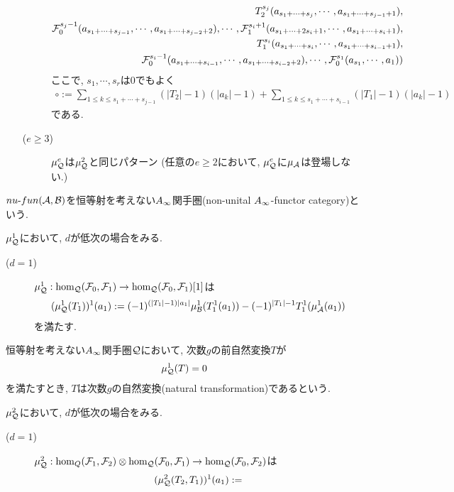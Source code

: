 \documentclass[uplatex, a4paper, 14Q, dvipdfmx]{jsarticle}
\begin{document}
\begin{definition}
\begin{itemize}
\begin{description}
\begin{align*}
        T^{s_j}_2(a_{s_1+\cdots+s_j}, \cdots, a_{s_1+\cdots+s_{j-1}+1}), \\
        \mathcal{F}^{s_j-1}_0(a_{s_1+\cdots+s_{j-1}}, \cdots, a_{s_1+\cdots+s_{j-2}+2}), \cdots, \mathcal{F}^{s_i+1}_1(a_{s_1+\cdots+2s_i+1}, \cdots, a_{s_1+\cdots+s_i+1}), \\
        T^{s_i}_1(a_{s_1+\cdots+s_i}, \cdots, a_{s_1+\cdots+s_{i-1}+1}), \\
        \mathcal{F}^{s_i-1}_0(a_{s_1+\cdots+s_{i-1}}, \cdots, a_{s_1+\cdots+s_{i-2}+2}), \cdots, \mathcal{F}^{s_1}_0(a_{s_1},\cdots,a_1)
        )
      \end{align*}
      ここで, $s_1,\cdots,s_r$は$0$でもよく 
      \begin{align*}
        \circ 
        :=\sum_{1 \leq k \leq s_1+\cdots+s_{j-1}} (|T_2|-1)(|a_k|-1) + \sum_{1 \leq k \leq s_1+\cdots+s_{i-1}} (|T_1|-1)(|a_k|-1)
      \end{align*}
      である. 
      \item[($e \geq 3$)] $\mu^e_{\mathcal{Q}}$は$\mu^2_{\mathcal{Q}}$と同じパターン (任意の$e \geq 2$において, $\mu^e_{\mathcal{Q}}$に$\mu_{\mathcal{A}}$は登場しない.)
    \end{description}
  \end{itemize}
  $nu \text{-} fun (\mathcal{A}, \mathcal{B})$を恒等射を考えない$A_{\infty}$関手圏(non-unital $A_{\infty}$-functor category)という.
\end{definition}

\begin{remark}
  $\mu^1_{\mathcal{Q}}$において, $d$が低次の場合をみる. 
  \begin{description}
    \item[($d=1$)] $\mu^1_{\mathcal{Q}} : \hom_{\mathcal{Q}}(\mathcal{F}_0,\mathcal{F}_1) \to \hom_{\mathcal{Q}}(\mathcal{F}_0,\mathcal{F}_1)[1]$は
    \begin{align*}
      (\mu^1_{\mathcal{Q}}(T_1))^1(a_1) 
      := (-1)^{(|T_1|-1)|a_1|} \mu^1_{\mathcal{B}}(T^1_1(a_1)) - (-1)^{|T_1|-1} T^1_1(\mu^1_{\mathcal{A}}(a_1))
    \end{align*}
    を満たす. 

  \end{description}
\end{remark}

\begin{definition}[自然変換]
  恒等射を考えない$A_{\infty}$関手圏$\mathcal{Q}$において, 次数$g$の前自然変換$T$が
  \begin{align*}
    \mu^1_{\mathcal{Q}}(T) = 0  
  \end{align*}
  を満たすとき, $T$は次数$g$の自然変換(natural transformation)であるという. 
\end{definition}

\begin{remark}
  $\mu^2_{\mathcal{Q}}$において, $d$が低次の場合をみる. 
  \begin{description}
    \item[($d=1$)] $\mu^2_{\mathcal{Q}} : \hom_Q(\mathcal{F}_1,\mathcal{F}_2) \otimes \hom_{\mathcal{Q}}(\mathcal{F}_0,\mathcal{F}_1) \to \hom_{\mathcal{Q}}(\mathcal{F}_0,\mathcal{F}_2)$は
    \begin{align*}
      (\mu^2_{\mathcal{Q}}(T_2,T_1))^1(a_1) 
      := 
    \end{align*}
  \end{description}
\end{remark}
\end{document}
